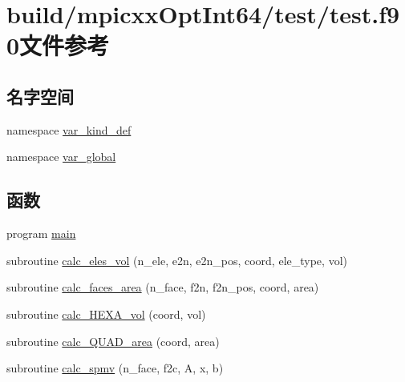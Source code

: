 \hypertarget{test_8f90}{
\section{build/mpicxxOptInt64/test/test.f90文件参考}
\label{test_8f90}
}
\subsection*{名字空间}
\begin{DoxyCompactItemize}
\item 
namespace \hyperlink{namespacevar__kind__def}{var\_\-kind\_\-def}
\item 
namespace \hyperlink{namespacevar__global}{var\_\-global}
\end{DoxyCompactItemize}
\subsection*{函数}
\begin{DoxyCompactItemize}
\item 
program \hyperlink{test_8f90_a8ec2266d83cd6c0b762cbcbc92c0af3d}{main}
\item 
subroutine \hyperlink{test_8f90_ab0feb0b96896d0783a452ceb0884de54}{calc\_\-eles\_\-vol} (n\_\-ele, e2n, e2n\_\-pos, coord, ele\_\-type, vol)
\item 
subroutine \hyperlink{test_8f90_a65b36ff25ffa106dab5c6b52332982e1}{calc\_\-faces\_\-area} (n\_\-face, f2n, f2n\_\-pos, coord, area)
\item 
subroutine \hyperlink{test_8f90_aedcabc3101935ffa79dac989cdf8cf09}{calc\_\-HEXA\_\-vol} (coord, vol)
\item 
subroutine \hyperlink{test_8f90_a638fb93022b93255d8000bacff09a674}{calc\_\-QUAD\_\-area} (coord, area)
\item 
subroutine \hyperlink{test_8f90_a5595358e7ada913cd10a206235165422}{calc\_\-spmv} (n\_\-face, f2c, A, x, b)
\end{DoxyCompactItemize}



